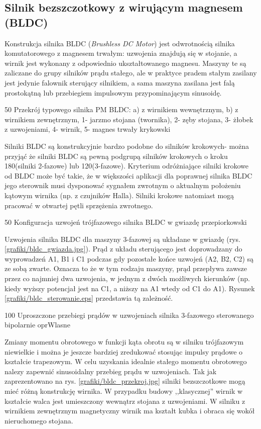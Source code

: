\subsection{Silnik bezszczotkowy z wirującym magnesem (BLDC)}

Konstrukcja silnika BLDC ({\it Brushless DC Motor}) jest odwrotnością silnika komutatorowego z magnesem trwałym: uzwojenia znajdują się w stojanie, a wirnik jest wykonany z odpowiednio ukształtowanego magnesu. Maszyny te są zaliczane do grupy silników prądu stałego, ale w praktyce pradem stałym zasilany jest jedynie falownik sterujący silnikiem, a sama maszyna zasilana jest falą prostokątną lub przebiegiem impulsowym przypominającym sinusoidę. 

		{50}
		{Przekrój typowego silnika PM BLDC: a) z wirnikiem wewnętrznym, b) z wirnikiem zewnętrznym, 1- jarzmo stojana (twornika), 2- zęby stojana, 3- żłobek z uzwojeniami, 4- wirnik, 5- magnes trwały}
		{krykowski}
		
Silniki BLDC są konstrukcyjnie bardzo podobne do silników krokowych- można przyjąć że silniki BLDC są pewną podgrupą silników krokowych o kroku 180\degree (silniki 2-fazowe) lub 120\degree (3-fazowe). Kryterium odróżniające silniki krokowe od BLDC może być takie, że w większości aplikacji dla poprawnej silnika BLDC jego sterownik musi dysponować sygnałem zwrotnym o aktualnym położeniu kątowym wirnika (np. z czujników Halla). Silniki krokowe natomiast mogą pracować w otwartej pętli sprzężenia zwrotnego.

		{50}
		{Konfiguracja uzwojeń trójfazowego silnika BLDC w gwiazdę}
		{przepiorkowski}
		
Uzwojenia silnika BLDC dla maszyny 3-fazowej są układane w gwiazdę (rys. \ref{grafiki/bldc_gwiazda.jpg}). Prąd z układu sterującego jest doprowadzany do wyprowadzeń A1, B1 i C1 podczas gdy pozostałe końce uzwojeń (A2, B2, C2) są ze sobą zwarte. Oznacza to że w tym rodzaju maszyny, prąd przepływa zawsze przez co najmniej dwa uzwojenia, w jednym z dwóch możliwych kierunków (np. kiedy wyższy potencjał jest na C1, a niższy na A1 wtedy od C1 do A1). Rysunek \ref{grafiki/bldc_sterowanie.eps} przedstawia tą zależność.

		{100}
		{Uproszczone przebiegi prądów w uzwojeniach silnika 3-fazowego sterowanego bipolarnie}
		{oprWlasne}
		
Zmiany momentu obrotowego w funkcji kąta obrotu są w silniku trójfazowym niewielkie i można je jeszcze bardziej zredukować stosując impulsy prądowe o kształcie trapezowym. W celu uzyskania idealnie stałego momentu obrotowego nalezy zapewnić sinusoidalny przebieg prądu w uzwojeniach. 
Tak jak zaprezentowano na rys. \ref{grafiki/bldc_przekroj.jpg} silniki bezszczotkowe mogą mieć różną konstrukcję wirnika. W przypadku budowy ,,klasycznej'' wirnik w kształcie walca jest umieszczony wewnątrz stojana z uzwojeniami. W silniku z wirnikiem zewnętrznym magnetyczny wirnik ma kształt kubka i obraca się wokół nieruchomego stojana. \\

